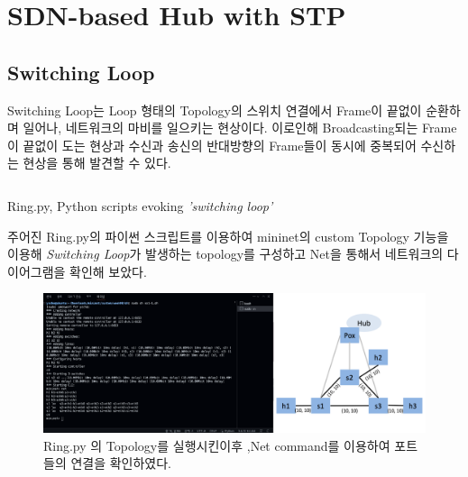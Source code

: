 \section{SDN-based Hub with STP}
\subsection{Switching Loop}
Switching Loop는 Loop 형태의 Topology의 스위치 연결에서 Frame이 끝없이 순환하며 일어나, 네트워크의 마비를 일으키는 현상이다. 이로인해 Broadcasting되는 Frame이 끝없이 도는 현상과 수신과 송신의 반대방향의 Frame들이 동시에 중복되어 수신하는 현상을 통해 발견할 수 있다. \\
\vspace{-4mm}
\begin{listing}[h!]
\inputminted[framerule = 1pt,framesep = 2mm , frame = lines, fontsize=\footnotesize]{python}{./code/week08/Ring.py}
\caption{\footnotesize Ring.py, Python scripts evoking \textit{'switching loop'}}
\end{listing}

주어진 Ring.py의 파이썬 스크립트를 이용하여 mininet의 custom Topology 기능을 이용해 \textit{Switching Loop}가 발생하는 topology를 구성하고 Net을 통해서 네트워크의 다이어그램을 확인해 보았다.\\
\vspace{-4mm}
\begin{figure}[!h]\centering 
	\includegraphics[width=.99\textwidth]{image/week08/1-0.png}
	\caption{\footnotesize
	Ring.py 의 Topology를 실행시킨이후 ,Net command를 이용하여 포트들의 연결을 확인하였다. }
	\vspace{-10pt}
\end{figure}
\clearpage


